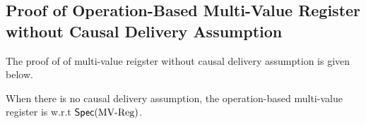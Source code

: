 \subsection{Proof of Operation-Based Multi-Value Register without Causal Delivery Assumption}
\label{subsec:proof of operation-based multi-value register without causal delivery assumption}

The proof of \crdtlin{} of multi-value reigster without causal delivery assumption is given below.


\begin{lemma}
\label{lemma:when there is no causal delivery assumption, the operation-based multi-value register is still correct}
When there is no causal delivery assumption, the operation-based multi-value register is \crdtlinearizable{} w.r.t $\mathsf{Spec}(\text{MV\text{-}Reg})$.
\end{lemma}


